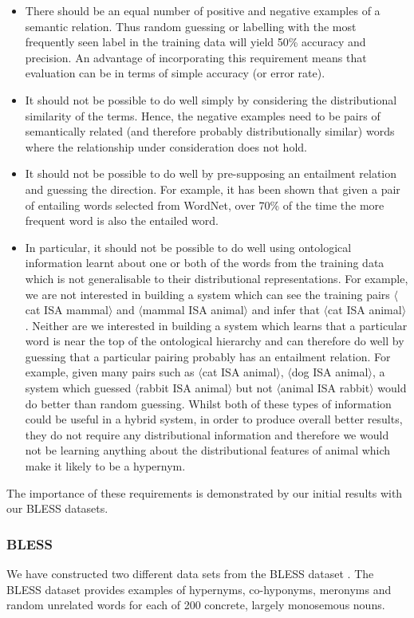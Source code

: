 \documentclass[11pt]{article}
\newcommand\pair[2]{$\langle$#1 ISA #2$\rangle$}
\begin{document}
\begin{itemize}
\item There should be an equal number of positive and negative examples of a semantic relation.  Thus random guessing or labelling with the most frequently seen label in the training data will yield 50\% accuracy and precision.  An advantage of incorporating this requirement means that evaluation can be in terms of simple accuracy (or error rate).
\item It should not be possible to do well simply by considering the distributional similarity of the terms.  Hence, the negative examples need to be pairs of semantically related (and therefore probably distributionally similar) words where the relationship under consideration does not hold.
\item It should not be possible to do well by pre-supposing an entailment relation and guessing the direction.  For example, it has been shown \cite{Weeds2004} that given a pair of entailing words selected from WordNet, over 70\% of the time the more frequent word is also the entailed word.
\item In particular, it should not be possible to do well using ontological information learnt about one or both of the words from the training data which is not generalisable to their distributional representations.  For example, we are not interested in building a system which can see the training pairs \pair{cat}{mammal} and \pair{mammal}{animal} and infer that \pair{cat}{animal}.  Neither are we interested in building a system which learns that a particular word is near the top of the ontological hierarchy and can therefore do well by guessing that a particular pairing probably has an entailment relation.  For example, given many pairs such as \pair{cat}{animal}, \pair{dog}{animal}, a system which guessed \pair{rabbit}{animal} but not \pair{animal}{rabbit} would do better than random guessing.  Whilst both of these types of information could be useful in a hybrid system, in order to produce overall better results, they do not require any distributional information and therefore we would not be learning anything about the distributional features of animal which make it likely to be a hypernym.
\end{itemize}

The importance of these requirements is demonstrated by our initial results with our BLESS datasets.

\subsubsection{BLESS}
We have constructed two different data sets from the BLESS dataset \cite{Baroni2011}.  The BLESS dataset provides examples of hypernyms, co-hyponyms, meronyms and random unrelated words for each of 200 concrete, largely monosemous nouns.
\end{document}
